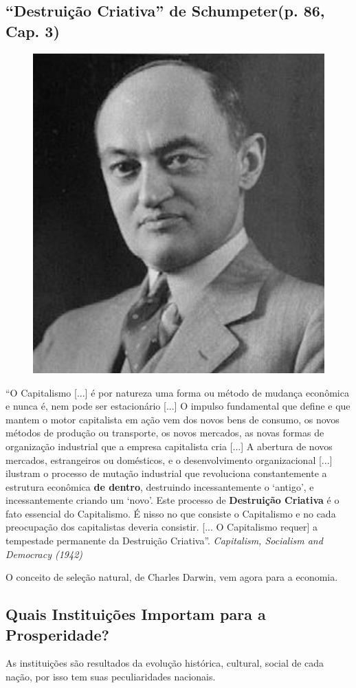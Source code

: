 \documentclass[a4paper,12pt]{article}[abntex2]
\begin{document}
\subsection{\textbf{“Destruição Criativa” de Schumpeter(p. 86, Cap. 3)}}
\begin{figure}[H]
    \centering
    \includegraphics[width=0.5\linewidth]{Imagens/a2i7.png}
\end{figure}
“O Capitalismo [...] é por natureza uma forma ou método de mudança econômica e nunca é, nem pode ser estacionário [...] O impulso fundamental que define e que mantem o motor capitalista em ação vem dos novos bens de consumo, os novos métodos de produção ou transporte, os novos mercados, as novas formas de organização industrial que a empresa capitalista cria [...] A abertura de novos mercados, estrangeiros ou domésticos, e o desenvolvimento organizacional [...] ilustram o processo de mutação industrial que revoluciona constantemente a estrutura econômica \textbf{de dentro}, destruindo incessantemente o ‘antigo’, e incessantemente criando um ‘novo’. Este processo de \textbf{Destruição Criativa }é o fato essencial do Capitalismo. É nisso no que consiste o Capitalismo e no cada preocupação dos capitalistas deveria consistir. [... O Capitalismo requer] a tempestade permanente da Destruição Criativa”. \textit{Capitalism, Socialism and Democracy (1942)}

O conceito de seleção natural, de Charles Darwin, vem agora para a economia.

\subsection{\textbf{Quais Instituições Importam para a Prosperidade?}}
As instituições são resultados da evolução histórica, cultural, social de cada nação, por isso tem suas peculiaridades nacionais.
\end{document}
